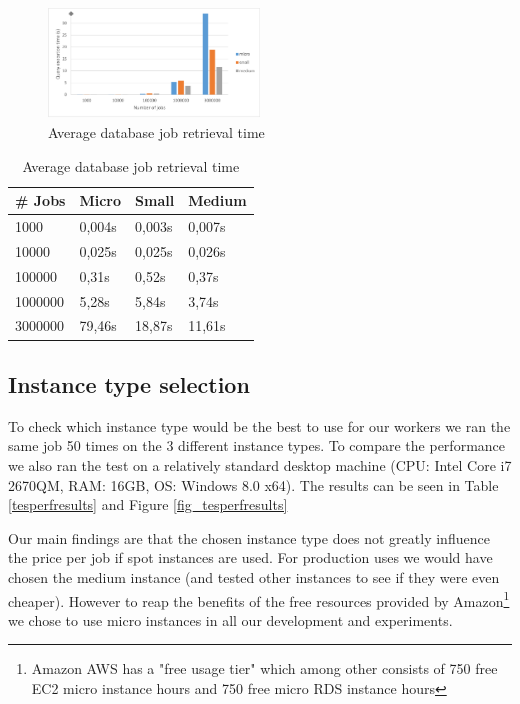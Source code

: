 \documentclass[a4paper]{IEEEtran}
\begin{document}
\begin{figure}
\centering
\includegraphics[width=0.5\textwidth]{"results-database"}
\caption{Average database job retrieval time}
\label{fig_dbperfresults}
\end{figure}

\begin{table}
\caption{Average database job retrieval time}
\label{dbperfresults}
\centering
\begin{tabular}{| l | l | l | l |}
\hline
\# Jobs & Micro & Small & Medium \\ \hline
1000 & 0,004s &	0,003s & 0,007s \\ \hline
10000 & 0,025s & 0,025s & 0,026s \\ \hline
100000 & 0,31s & 0,52s & 0,37s \\ \hline
1000000 & 5,28s & 5,84s & 3,74s \\ \hline
3000000	& 79,46s & 18,87s & 11,61s \\ \hline
\end{tabular}
\end{table}

\subsection{Instance type selection}

To check which instance type would be the best to use for our workers we ran the same job 50 times on the 3 different instance types. To compare the performance we also ran the test on a relatively standard desktop machine (CPU: Intel Core i7 2670QM, RAM: 16GB, OS: Windows 8.0 x64). The results can be seen in Table \ref{tesperfresults} and Figure \ref{fig_tesperfresults}

Our main findings are that the chosen instance type does not greatly influence the price per job if spot instances are used. For production uses we would have chosen the medium instance (and tested other instances to see if they were even cheaper). However to reap the benefits of the free resources provided by Amazon\footnote{Amazon AWS has a "free usage tier" which among other consists of 750 free EC2 micro instance hours and 750 free micro RDS instance hours} we chose to use micro instances in all our development and experiments.
\end{document}
